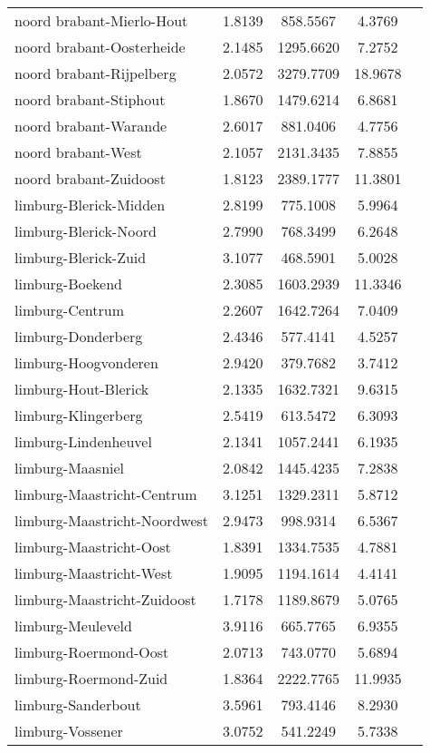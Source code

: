 \begin{longtable}{llccc}
noord brabant-Mierlo-Hout & 1.8139 & 858.5567 & 4.3769 \\
noord brabant-Oosterheide & 2.1485 & 1295.6620 & 7.2752 \\
noord brabant-Rijpelberg & 2.0572 & 3279.7709 & 18.9678 \\
noord brabant-Stiphout & 1.8670 & 1479.6214 & 6.8681 \\
noord brabant-Warande & 2.6017 & 881.0406 & 4.7756 \\
noord brabant-West & 2.1057 & 2131.3435 & 7.8855 \\
noord brabant-Zuidoost & 1.8123 & 2389.1777 & 11.3801 \\
limburg-Blerick-Midden & 2.8199 & 775.1008 & 5.9964 \\
limburg-Blerick-Noord & 2.7990 & 768.3499 & 6.2648 \\
limburg-Blerick-Zuid & 3.1077 & 468.5901 & 5.0028 \\
limburg-Boekend & 2.3085 & 1603.2939 & 11.3346 \\
limburg-Centrum & 2.2607 & 1642.7264 & 7.0409 \\
limburg-Donderberg & 2.4346 & 577.4141 & 4.5257 \\
limburg-Hoogvonderen & 2.9420 & 379.7682 & 3.7412 \\
limburg-Hout-Blerick & 2.1335 & 1632.7321 & 9.6315 \\
limburg-Klingerberg & 2.5419 & 613.5472 & 6.3093 \\
limburg-Lindenheuvel & 2.1341 & 1057.2441 & 6.1935 \\
limburg-Maasniel & 2.0842 & 1445.4235 & 7.2838 \\
limburg-Maastricht-Centrum & 3.1251 & 1329.2311 & 5.8712 \\
limburg-Maastricht-Noordwest & 2.9473 & 998.9314 & 6.5367 \\
limburg-Maastricht-Oost & 1.8391 & 1334.7535 & 4.7881 \\
limburg-Maastricht-West & 1.9095 & 1194.1614 & 4.4141 \\
limburg-Maastricht-Zuidoost & 1.7178 & 1189.8679 & 5.0765 \\
limburg-Meuleveld & 3.9116 & 665.7765 & 6.9355 \\
limburg-Roermond-Oost & 2.0713 & 743.0770 & 5.6894 \\
limburg-Roermond-Zuid & 1.8364 & 2222.7765 & 11.9935 \\
limburg-Sanderbout & 3.5961 & 793.4146 & 8.2930 \\
limburg-Vossener & 3.0752 & 541.2249 & 5.7338 \\

\end{longtable}
